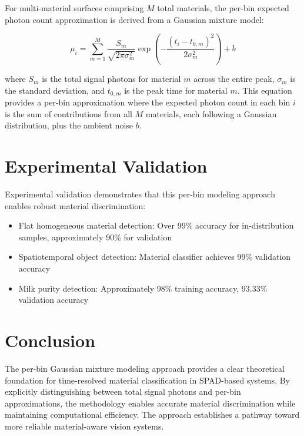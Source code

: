 \documentclass[10pt,twocolumn]{article}
\begin{document}
For multi-material surfaces comprising $M$ total materials, the per-bin expected photon count approximation is derived from a Gaussian mixture model:

\begin{equation}
\mu_i = \sum_{m=1}^{M} \frac{S_m}{\sqrt{2\pi\sigma_m^2}} \exp\left(-\frac{(t_i - t_{0,m})^2}{2\sigma_m^2}\right) + b
\end{equation}

where $S_m$ is the total signal photons for material $m$ across the entire peak, $\sigma_m$ is the standard deviation, and $t_{0,m}$ is the peak time for material $m$. This equation provides a per-bin approximation where the expected photon count in each bin $i$ is the sum of contributions from all $M$ materials, each following a Gaussian distribution, plus the ambient noise $b$.

\section{Experimental Validation}

Experimental validation demonstrates that this per-bin modeling approach enables robust material discrimination:

\begin{itemize}
    \item Flat homogeneous material detection: Over 99\% accuracy for in-distribution samples, approximately 90\% for validation
    \item Spatiotemporal object detection: Material classifier achieves 99\% validation accuracy
    \item Milk purity detection: Approximately 98\% training accuracy, 93.33\% validation accuracy
\end{itemize}

\section{Conclusion}

The per-bin Gaussian mixture modeling approach provides a clear theoretical foundation for time-resolved material classification in SPAD-based systems. By explicitly distinguishing between total signal photons and per-bin approximations, the methodology enables accurate material discrimination while maintaining computational efficiency. The approach establishes a pathway toward more reliable material-aware vision systems.



\end{document}
